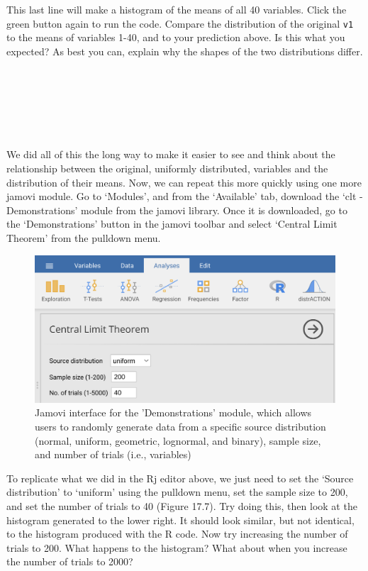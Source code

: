 \documentclass[
  openany]{krantz}
\begin{document}
This last line will make a histogram of the means of all 40 variables.
Click the green button again to run the code.
Compare the distribution of the original \texttt{v1} to the means of variables 1-40, and to your prediction above.
Is this what you expected?
As best you can, explain why the shapes of the two distributions differ.

\begin{verbatim}






\end{verbatim}

We did all of this the long way to make it easier to see and think about the relationship between the original, uniformly distributed, variables and the distribution of their means.
Now, we can repeat this more quickly using one more jamovi module.
Go to `Modules', and from the `Available' tab, download the `clt - Demonstrations' module from the jamovi library.
Once it is downloaded, go to the `Demonstrations' button in the jamovi toolbar and select `Central Limit Theorem' from the pulldown menu.

\begin{figure}
\includegraphics[width=0.8\linewidth]{img/jamovi_clt} \caption{Jamovi interface for the 'Demonstrations' module, which allows users to randomly generate data from a specific source distribution (normal, uniform, geometric, lognormal, and binary), sample size, and number of trials (i.e., variables)}\label{fig:unnamed-chunk-74}
\end{figure}

To replicate what we did in the Rj editor above, we just need to set the `Source distribution' to `uniform' using the pulldown menu, set the sample size to 200, and set the number of trials to 40 (Figure 17.7).
Try doing this, then look at the histogram generated to the lower right.
It should look similar, but not identical, to the histogram produced with the R code.
Now try increasing the number of trials to 200.
What happens to the histogram?
What about when you increase the number of trials to 2000?
\end{document}
